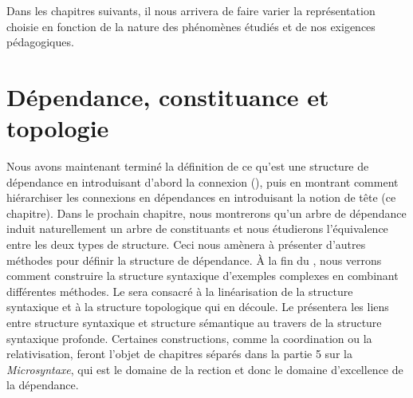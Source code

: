 Dans les chapitres suivants, il nous arrivera de faire varier la représentation choisie en fonction de la nature des phénomènes étudiés et de nos exigences pédagogiques.

\section{Dépendance, constituance et topologie}\label{sec:3.3.34}

Nous avons maintenant terminé la définition de ce qu’est une structure de dépendance en introduisant d’abord la connexion (), puis en montrant comment hiérarchiser les connexions en dépendances en introduisant la notion de tête (ce chapitre). Dans le prochain chapitre, nous montrerons qu’un arbre de dépendance induit naturellement un arbre de constituants et nous étudierons l’équivalence entre les deux types de structure. Ceci nous amènera à présenter d’autres méthodes pour définir la structure de dépendance. À la fin du , nous verrons comment construire la structure syntaxique d’exemples complexes en combinant différentes méthodes. Le  sera consacré à la linéarisation de la structure syntaxique et à la structure topologique qui en découle. Le  présentera les liens entre structure syntaxique et structure sémantique au travers de la structure syntaxique profonde. Certaines constructions, comme la coordination ou la relativisation, feront l’objet de chapitres séparés dans la partie 5 sur la \textit{Microsyntaxe}, qui est le domaine de la rection et donc le domaine d’excellence de la dépendance.

